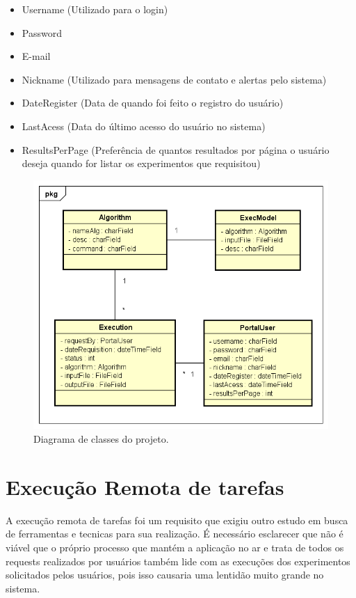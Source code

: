 \documentclass[tg]{mdtufsm}
\begin{document}
\begin{itemize}
	\item Username (Utilizado para o login)
	\item Password 
	\item E-mail
	\item Nickname (Utilizado para mensagens de contato e alertas pelo sistema)
	\item DateRegister (Data de quando foi feito o registro do usuário)
	\item LastAcess (Data do último acesso do usuário no sistema)
	\item ResultsPerPage (Preferência de quantos resultados por página o usuário deseja quando for listar os experimentos que requisitou)
\end{itemize}

\begin{figure}
	\centering
	\includegraphics[width=1\textwidth]{class_diagran_tg}
	\caption{
		Diagrama de classes do projeto.
	}
	\label{fig:path_tracing}
\end{figure}


\section{Execução Remota de tarefas}
A execução remota de tarefas foi um requisito que exigiu outro estudo em busca de ferramentas e tecnicas para sua realização. É necessário esclarecer que não é viável que o próprio processo que mantém a aplicação no ar e trata de todos os requests realizados por usuários também lide com as execuções dos experimentos solicitados pelos usuários, pois isso causaria uma lentidão muito grande no sistema.
\end{document}
